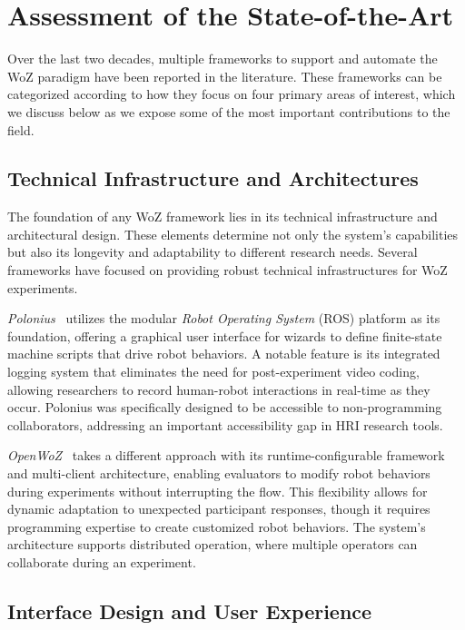 \documentclass[letterpaper, 10 pt, conference]{subfiles/ieeeconf}
\begin{document}
\section{Assessment of the State-of-the-Art}
\label{sota}

Over the last two decades, multiple frameworks to support and automate the WoZ paradigm have been reported in the literature. These frameworks can be categorized according to how they focus on four primary areas of interest, which we discuss below as we expose some of the most important contributions to the field.

\subsection{Technical Infrastructure and Architectures}

The foundation of any WoZ framework lies in its technical infrastructure and architectural design. These elements determine not only the system's capabilities but also its longevity and adaptability to different research needs. Several frameworks have focused on providing robust technical infrastructures for WoZ experiments.

\emph{Polonius}~\cite{Lu2011} utilizes the modular \emph{Robot Operating System} (ROS) platform as its foundation, offering a graphical user interface for wizards to define finite-state machine scripts that drive robot behaviors. A notable feature is its integrated logging system that eliminates the need for post-experiment video coding, allowing researchers to record human-robot interactions in real-time as they occur. Polonius was specifically designed to be accessible to non-programming collaborators, addressing an important accessibility gap in HRI research tools.

\emph{OpenWoZ}~\cite{Hoffman2016} takes a different approach with its runtime-configurable framework and multi-client architecture, enabling evaluators to modify robot behaviors during experiments without interrupting the flow. This flexibility allows for dynamic adaptation to unexpected participant responses, though it requires programming expertise to create customized robot behaviors. The system's architecture supports distributed operation, where multiple operators can collaborate during an experiment.


\subsection{Interface Design and User Experience}
\end{document}
